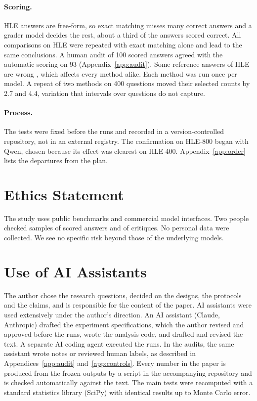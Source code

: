 \documentclass[11pt]{article}
\newcommand{\qw}{Qwen}
\begin{document}
\paragraph{Scoring.}
HLE answers are free-form, so exact matching misses many correct answers and a grader model decides the rest, about a third of the answers scored correct.
All comparisons on HLE were repeated with exact matching alone and lead to the same conclusions. A human audit of 100 scored answers agreed with the automatic scoring on 93 (Appendix~\ref{app:audit}).
Some reference answers of HLE are wrong \citep{zhai2026hleverified}, which affects every method alike.
Each method was run once per model. A repeat of two methods on 400 questions moved their selected counts by 2.7 and 4.4, variation that intervals over questions do not capture.

\paragraph{Process.}
The tests were fixed before the runs and recorded in a version-controlled repository, not in an external registry.
The confirmation on HLE-800 began with \qw, chosen because its effect was clearest on HLE-400.
Appendix~\ref{app:order} lists the departures from the plan.

\section*{Ethics Statement}

The study uses public benchmarks and commercial model interfaces.
Two people checked samples of scored answers and of critiques. No personal data were collected.
We see no specific risk beyond those of the underlying models.

\section*{Use of AI Assistants}

The author chose the research questions, decided on the designs, the protocols and the claims, and is responsible for the content of the paper.
AI assistants were used extensively under the author's direction.
An AI assistant (Claude, Anthropic) drafted the experiment specifications, which the author revised and approved before the runs, wrote the analysis code, and drafted and revised the text. A separate AI coding agent executed the runs.
In the audits, the same assistant wrote notes or reviewed human labels, as described in Appendices~\ref{app:audit} and~\ref{app:controls}.
Every number in the paper is produced from the frozen outputs by a script in the accompanying repository and is checked automatically against the text. The main tests were recomputed with a standard statistics library (SciPy) with identical results up to Monte Carlo error.
\end{document}
